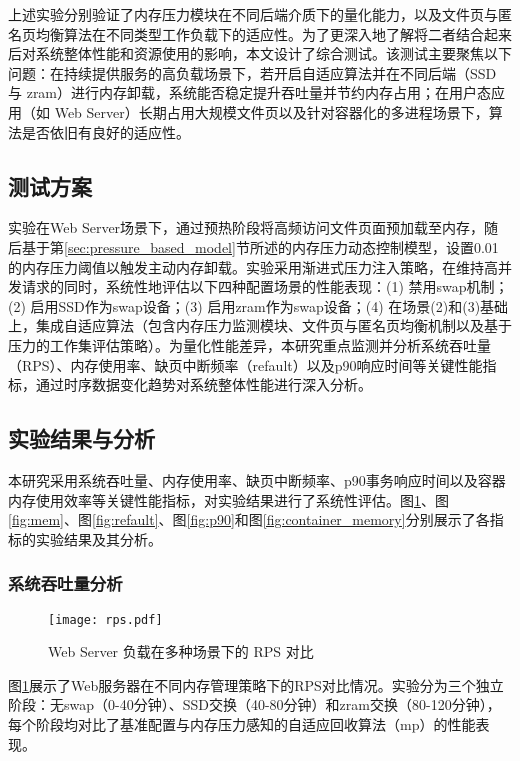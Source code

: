 上述实验分别验证了内存压力模块在不同后端介质下的量化能力，以及文件页与匿名页均衡算法在不同类型工作负载下的适应性。为了更深入地了解将二者结合起来后对系统整体性能和资源使用的影响，本文设计了综合测试。该测试主要聚焦以下问题：在持续提供服务的高负载场景下，若开启自适应算法并在不同后端（SSD 与 zram）进行内存卸载，系统能否稳定提升吞吐量并节约内存占用；在用户态应用（如 Web Server）长期占用大规模文件页以及针对容器化的多进程场景下，算法是否依旧有良好的适应性。

\subsection{测试方案}

实验在Web Server场景下，通过预热阶段将高频访问文件页面预加载至内存，随后基于第\ref{sec:pressure_based_model}节所述的内存压力动态控制模型，设置0.01的内存压力阈值以触发主动内存卸载。实验采用渐进式压力注入策略，在维持高并发请求的同时，系统性地评估以下四种配置场景的性能表现：(1) 禁用swap机制；(2) 启用SSD作为swap设备；(3) 启用zram作为swap设备；(4) 在场景(2)和(3)基础上，集成自适应算法（包含内存压力监测模块、文件页与匿名页均衡机制以及基于压力的工作集评估策略）。为量化性能差异，本研究重点监测并分析系统吞吐量（RPS）、内存使用率、缺页中断频率（refault）以及p90响应时间等关键性能指标，通过时序数据变化趋势对系统整体性能进行深入分析。

\subsection{实验结果与分析}
\label{sec:test_result}
本研究采用系统吞吐量、内存使用率、缺页中断频率、p90事务响应时间以及容器内存使用效率等关键性能指标，对实验结果进行了系统性评估。图\ref{fig:rps}、图\ref{fig:mem}、图\ref{fig:refault}、图\ref{fig:p90}和图\ref{fig:container_memory}分别展示了各指标的实验结果及其分析。

\subsubsection{系统吞吐量分析}
\begin{figure}[htbp]
    \centering
    \texttt{[image: rps.pdf]}
    \caption{Web Server 负载在多种场景下的 RPS 对比}
    \label{fig:rps}
\end{figure}
图\ref{fig:rps}展示了Web服务器在不同内存管理策略下的RPS对比情况。实验分为三个独立阶段：无swap（0-40分钟）、SSD交换（40-80分钟）和zram交换（80-120分钟），每个阶段均对比了基准配置与内存压力感知的自适应回收算法（mp）的性能表现。

